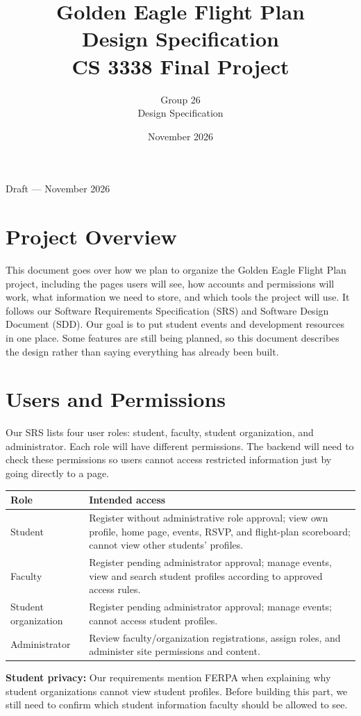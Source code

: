 \documentclass[11pt,letterpaper]{article}
\title{Golden Eagle Flight Plan\\Design Specification\\CS 3338 Final Project}
\author{Group 26\\Design Specification}
\date{November 2026}
\begin{document}
\maketitle
\begin{center}Draft --- November 2026\end{center}
\tableofcontents
\newpage

\section{Project Overview}
This document goes over how we plan to organize the Golden Eagle Flight Plan project, including the pages users will see, how accounts and permissions will work, what information we need to store, and which tools the project will use. It follows our Software Requirements Specification (SRS) and Software Design Document (SDD). Our goal is to put student events and development resources in one place. Some features are still being planned, so this document describes the design rather than saying everything has already been built.

\section{Users and Permissions}
Our SRS lists four user roles: student, faculty, student organization, and administrator. Each role will have different permissions. The backend will need to check these permissions so users cannot access restricted information just by going directly to a page.
\begin{longtable}{p{}p{}}
\toprule Role & Intended access \\ \midrule
Student & Register without administrative role approval; view own profile, home page, events, RSVP, and flight-plan scoreboard; cannot view other students' profiles.\\
Faculty & Register pending administrator approval; manage events, view and search student profiles according to approved access rules.\\
Student organization & Register pending administrator approval; manage events; cannot access student profiles.\\
Administrator & Review faculty/organization registrations, assign roles, and administer site permissions and content.\\
\bottomrule
\end{longtable}
\noindent\textbf{Student privacy:} Our requirements mention FERPA when explaining why student organizations cannot view student profiles. Before building this part, we still need to confirm which student information faculty should be allowed to see.
\end{document}

